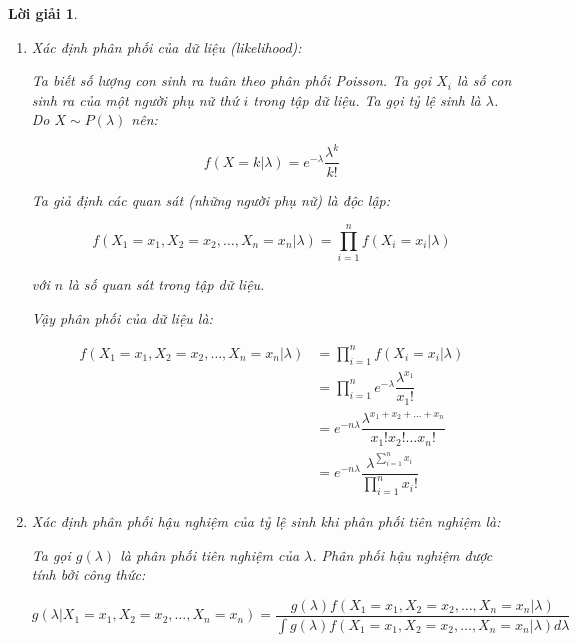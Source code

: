 \documentclass[14pt, a4paper]{article}
\theoremstyle{sltheorem}
\theoremstyle{soltheorem}
\newtheorem*{loigiai}{Lời giải}
\begin{document}
\begin{loigiai}
    \begin{enumerate}
        \item Xác định phân phối của dữ liệu (likelihood):
        
        Ta biết số lượng con sinh ra tuân theo phân phối Poisson.
        Ta gọi $X_i$ là số con sinh ra của một người phụ nữ thứ $i$ trong tập dữ liệu.
        Ta gọi tỷ lệ sinh là $\lambda$.
        Do $X \sim P(\lambda)$ nên:

        \begin{equation*}
            f(X=k \vert \lambda) = e^{-\lambda} \dfrac{\lambda^k}{k!}
        \end{equation*}

        Ta giả định các quan sát (những người phụ nữ) là độc lập:

        \begin{equation*}
            f(X_1=x_1,X_2=x_2,\dots, X_n=x_n \vert \lambda) = \prod_{i=1}^n f(X_i = x_i \vert \lambda)
        \end{equation*}

        với $n$ là số quan sát trong tập dữ liệu.

        Vậy phân phối của dữ liệu là:

        \begin{equation*}
            \begin{aligned}
                f(X_1=x_1,X_2=x_2,\dots, X_n=x_n \vert \lambda) &= \prod_{i=1}^n f(X_i = x_i \vert \lambda) \\
                &= \prod_{i=1}^n e^{-\lambda} \dfrac{\lambda^{x_1}}{x_1!} \\
                &= e^{-n\lambda} \dfrac{\lambda^{x_1 + x_2 + \dots + x_n}}{x_1! x_2! \dots x_n!} \\
                &= e^{-n\lambda} \dfrac{\lambda^{\sum_{i=1}^n x_i}}{\prod_{i=1}^n x_i!}
            \end{aligned}
        \end{equation*}

        \item Xác định phân phối hậu nghiệm của tỷ lệ sinh khi phân phối tiên nghiệm là:

        Ta gọi $g(\lambda)$ là phân phối tiên nghiệm của $\lambda$.
        Phân phối hậu nghiệm được tính bởi công thức:

        \begin{equation*}
            g(\lambda \vert X_1 =x_1, X_2=x_2, \dots, X_n=x_n) = \dfrac{g(\lambda) f(X_1=x_1,X_2=x_2,\dots, X_n=x_n \vert \lambda)}{\int g(\lambda) f(X_1=x_1,X_2=x_2,\dots, X_n=x_n \vert \lambda) d \lambda}
        \end{equation*}


\end{enumerate}
\end{loigiai}
\end{document}
